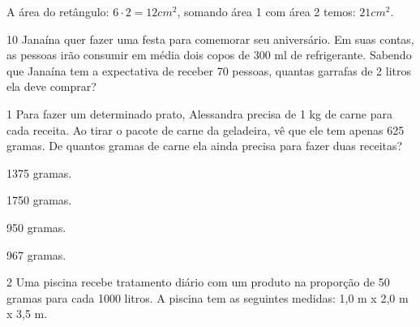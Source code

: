 {{{\begin{escolha}
{{{{{\begin{escolha}
\begin{escolha}
{\begin{q°}
{\begin{enumerate}
{{{A área do retângulo: $6 \cdot 2 = 12 cm^2$, somando área 1 com área 2 temos: $21
cm^2$.}

\num{10} Janaína quer fazer uma festa para comemorar seu aniversário. Em suas
contas, as pessoas irão consumir em média dois copos de 300 ml de refrigerante.
Sabendo que Janaína tem a expectativa de receber 70 pessoas, quantas garrafas de
2 litros ela deve comprar?




\num{1} Para fazer um determinado prato, Alessandra precisa de 1 kg de carne
para cada receita. Ao tirar o pacote de carne da geladeira, vê que ele
tem apenas 625 gramas. De quantos gramas de carne ela ainda precisa para
fazer duas receitas?

\begin{escolha}

  \item 1375 gramas.

  \item 1750 gramas.

  \item 950 gramas.

  \item 967 gramas.

\end{escolha}


\num{2} Uma piscina recebe tratamento diário com um produto na proporção de
50 gramas para cada 1000 litros. A piscina tem as seguintes medidas:
1,0 m x 2,0 m x 3,5 m. 



}}
\end{enumerate}}
\end{q°}}
\end{escolha}
\end{escolha}}}}}}
\end{escolha}}}}
